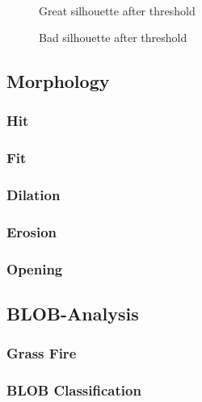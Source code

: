 \begin{figure}[htbp]
\begin{minipage}[b]{0.45\textwidth}
\end{minipage} \\ %
\begin{minipage}[t]{0.45\textwidth}
\caption{Great silhouette after threshold} %
\label{fig:SimpleThresholdAfter}
\end{minipage} \hfill
\begin{minipage}[t]{0.45\textwidth}
\caption{Bad silhouette after threshold} %
\label{fig:ComplicatedThresholdAfter}
\end{minipage}
\end{figure}
 
 
 
\subsection{Morphology}
\subsubsection{Hit}
\subsubsection{Fit}
\subsubsection{Dilation}
\subsubsection{Erosion}
\subsubsection{Opening}
\subsection{BLOB-Analysis}
\subsubsection{Grass Fire}
\subsubsection{BLOB Classification}

